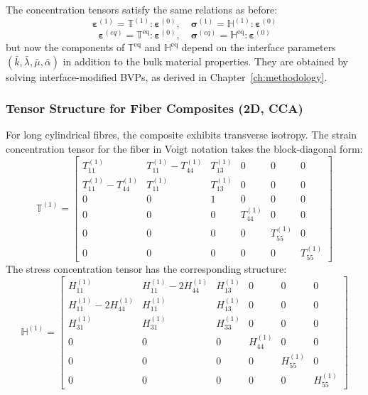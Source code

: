 \documentclass[oneside, 12pt, a4paper, bibliography=totoc]{book}
\newcommand{\bs}[1]{\bm{#1}}                       %
\begin{document}
The concentration tensors satisfy the same relations as before:
%
\begin{equation}
    \bs{\varepsilon}^{(1)} = \mathbb{T}^{(1)} : \bs{\varepsilon}^{(0)}, \quad
    \bs{\sigma}^{(1)} = \mathbb{H}^{(1)} : \bs{\varepsilon}^{(0)}
    \label{eq:interface_concentration_def}
\end{equation}
%
\begin{equation}
    \bs{\varepsilon}^{(eq)} = \mathbb{T}^{\text{eq}} : \bs{\varepsilon}^{(0)}, \quad
    \bs{\sigma}^{(eq)} = \mathbb{H}^{\text{eq}} : \bs{\varepsilon}^{(0)}
    \label{eq:interface_concentration_eq}
\end{equation}
but now the components of $\mathbb{T}^{\text{eq}}$ and $\mathbb{H}^{\text{eq}}$ depend on the interface parameters $(\bar{k}, \bar{\lambda}, \bar{\mu}, \bar{\alpha})$ in addition to the bulk material properties. They are obtained by solving interface-modified BVPs, as derived in Chapter~\ref{ch:methodology}.

\subsubsection{Tensor Structure for Fiber Composites (2D, CCA)}

For long cylindrical fibres, the composite exhibits transverse isotropy. The strain concentration tensor for the fiber in Voigt notation takes the block-diagonal form:
%
\begin{equation}
    \mathbb{T}^{(1)} =
    \begin{bmatrix}
        T_{11}^{(1)}  & T_{11}^{(1)} - T_{44}^{(1)} & T_{13}^{(1)} & 0 & 0 & 0 \\[4pt]
        T_{11}^{(1)} - T_{44}^{(1)} &  T_{11}^{(1)} & T_{13}^{(1)} & 0 & 0 & 0 \\[4pt]
        0 & 0 & 1 & 0 & 0 & 0 \\[4pt]
        0 & 0 & 0 & T_{44}^{(1)} & 0 & 0 \\[4pt]
        0 & 0 & 0 & 0 & T_{55}^{(1)} & 0 \\[4pt]
        0 & 0 & 0 & 0 & 0 & T_{55}^{(1)}
    \end{bmatrix}
    \label{eq:T_fiber_interface_cca}
\end{equation}
%
The stress concentration tensor has the corresponding structure:
%
\begin{equation}
    \mathbb{H}^{(1)} =
    \begin{bmatrix}
        H_{11}^{(1)} & H_{11}^{(1)} - 2H_{44}^{(1)} & H_{13}^{(1)} & 0 & 0 & 0 \\[4pt]
        H_{11}^{(1)} - 2H_{44}^{(1)} & H_{11}^{(1)} & H_{13}^{(1)} & 0 & 0 & 0 \\[4pt]
        H_{31}^{(1)} & H_{31}^{(1)} & H_{33}^{(1)} & 0 & 0 & 0 \\[4pt]
        0 & 0 & 0 & H_{44}^{(1)} & 0 & 0 \\[4pt]
        0 & 0 & 0 & 0 & H_{55}^{(1)} & 0 \\[4pt]
        0 & 0 & 0 & 0 & 0 & H_{55}^{(1)}
    \end{bmatrix}
    \label{eq:H_fiber_interface_cca}
\end{equation}
\end{document}
